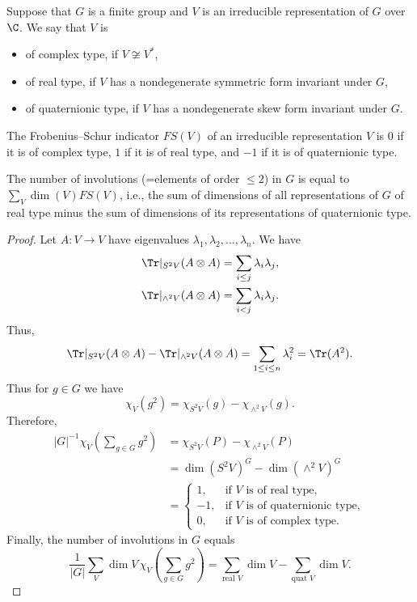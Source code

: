 
Suppose that $G$ is a finite group and $V$ is an irreducible representation of $G$ over $\C$. We say that $V$ is
\begin{itemize}
\item of complex type, if $V\not\cong V^*$,
\item of real type, if $V$ has a nondegenerate symmetric form invariant under $G$,
\item of quaternionic type, if $V$ has a nondegenerate skew form invariant under $G$.
\end{itemize}
\begin{definition}[4.3]
The Frobenius--Schur indicator $FS(V)$ of an irreducible representation $V$ is $0$ if it is of complex type, $1$ if it is of real type, and $-1$ if it is of quaternionic type.
\end{definition}
\begin{theorem}
The number of involutions (=elements of order $\leq2$) in $G$ is equal to $\sum_V\dim(V)FS(V)$, i.e., the sum of dimensions of all representations of $G$ of real type minus the sum of dimensions of its representations of quaternionic type.
\end{theorem}
\begin{proof}
Let $A:V\to V$ have eigenvalues $\lambda_1,\lambda_2,\ldots,\lambda_n$. We have
\begin{align*}
\Tr|_{S^2V}(A\otimes A)&=\sum_{i\leq j}\lambda_i\lambda_j,\\
\Tr|_{\wedge^2V}(A\otimes A)&=\sum_{i<j}\lambda_i\lambda_j.
\end{align*}
Thus,
\[
\Tr|_{S^2V}(A\otimes A)-\Tr|_{\wedge^2V}(A\otimes A)
=\sum_{1\leq i\leq n}\lambda_i^2=\Tr(A^2).
\]
Thus for $g\in G$ we have
\[\chi_V(g^2)=\chi_{S^2V}(g)-\chi_{\wedge^2V}(g).\]
Therefore,
\begin{align*}
|G|^{-1}\chi_V\left(\sum_{g\in G}g^2\right)
&=\chi_{S^2V}(P)-\chi_{\wedge^2V}(P)\\
&=\dim(S^2V)^G-\dim(\wedge^2V)^G\\
&=\begin{cases}
1,&\text{if $V$ is of real type},\\
-1,&\text{if $V$ is of quaternionic type},\\
0,&\text{if $V$ is of complex type}.
\end{cases}
\end{align*}
Finally, the number of involutions in $G$ equals
\[
\frac1{|G|}\sum_V\dim V\,\chi_V\left(\sum_{g\in G}g^2\right)
=\sum_{\text{real }V}\dim V-\sum_{\text{quat }V}\dim V.
\]
\end{proof}

